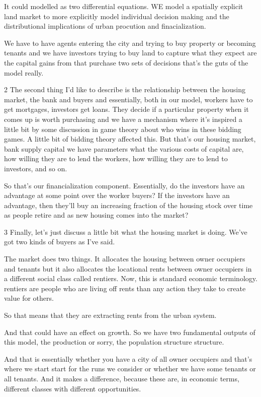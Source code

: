 \documentclass[]{article}
\begin{document}
It could modelled as two differential equations. WE model a spatially explicit land market to more explicitly model individual decision making and the distributional implications of urban procution and finacialization. 

We have to have agents entering the city and trying to buy property or becoming tenants and we have investors trying to buy land to capture what they expect are the capital gains from that purchase two sets of decisions that's the guts of the model really.


2 The second thing I'd like to describe is the relationship between
the housing market, the bank and buyers and essentially, both in our model, workers have to get mortgages, investors get loans. They decide if a particular property when it comes up is worth purchasing and we have a mechanism where it's inspired a little bit by some discussion in game theory about who wins in these bidding games. A little bit of bidding theory affected this. But that's our housing market, bank supply capital we have parameters what the various costs of capital are, how willing they are to lend the workers, how willing they are to lend to investors, and so on.

So that's our financialization component. Essentially,  do the investors have an advantage at some point over the worker buyers? If the investors have an advantage, then they'll buy an increasing fraction of the housing stock over time as people retire and as new housing comes into the market?



3 Finally, let's just discuss a little bit what the housing market is doing. We've got two kinds of buyers as I've said.

The market does two things. It allocates the housing between owner occupiers and tenants but it also allocates the locational rents between owner occupiers in a different social class called rentiers. Now, this is standard economic terminology. rentiers are people who are living off  rents than any action they take to create value for others.

So that means that they are extracting rents from the urban system.

And that could have an effect on growth. So we have two fundamental outputs of this model, the production or sorry, the population structure structure.

And that is essentially whether you have a city of all owner occupiers and that's where we start start for the runs we consider or whether we have some tenants or all tenants. And it makes a difference, because these are, in economic terms, different classes with different opportunities.
\end{document}
